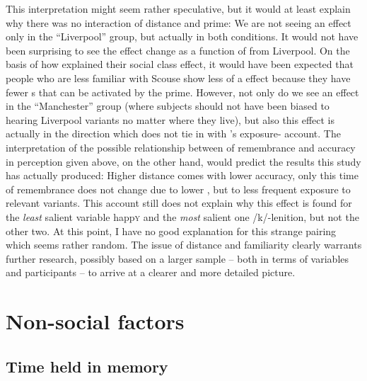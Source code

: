 This interpretation might seem rather speculative, but it would at least explain why there was no interaction of distance and prime: We are not seeing an effect only in the ``Liverpool'' group, but actually in both conditions.
It would not have been surprising to see the  effect change as a function of  from Liverpool.
On the basis of how \textcite{haydrager2010} explained their social class effect, it would have been expected that people who are less familiar with Scouse show less of a  effect because they have fewer s that can be activated by the prime.
However, not only do we see an effect in the ``Manchester'' group (where subjects should not have been biased to hearing Liverpool variants no matter where they live), but also this effect is actually in the direction which does not tie in with \citeauthor{haydrager2010}'s exposure- account.
The interpretation of the possible relationship between  of remembrance and accuracy in perception given above, on the other hand, would predict the results this study has actually produced: Higher distance comes with lower accuracy, only this time  of remembrance does not change due to lower , but to less frequent exposure to relevant variants.
This account still does not explain why this effect is found for the \emph{least} salient variable happ\textsc{y} and the \emph{most} salient one /k/-lenition, but not the other two.
At this point, I have no good explanation for this strange pairing which seems rather random.
The issue of distance and familiarity clearly warrants further research, possibly based on a larger sample -- both in terms of variables and participants -- to arrive at a clearer and more detailed picture.

	\section{Non-social factors}
		\label{sec.perc_res.disc.nonsocial}

		\subsection{Time held in memory}


